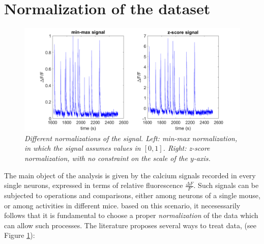 \documentclass[12pt, a4paper]{report}
\begin{document}
\section{Normalization of the dataset}


\begin{figure}[H]
	
	\begin{center}
		\hspace*{-1cm}
		\includegraphics[scale=.47]{normalizations.png} 
	\end{center} 
	\caption{\textit{Different normalizations of the signal. Left: min-max normalization, in which the signal assumes values in $[0,1]$. Right: z-score normalization, with no constraint on the scale of the $y$-axis. }}
	\label{normalizations}
\end{figure}

The main object of the analysis is given by the calcium signals recorded in every single neurons, expressed in terms of relative fluorescence $\frac{\Delta F}{F}$. Such signals can be subjected to operations and comparisons, either among neurons of a single mouse, or among activities in different mice. based on this scenario, it necesessarily follows that it is fundamental to choose a proper \textit{normalization} of the data which can allow such processes. The literature proposes several ways to treat data, (see Figure \ref{normalizations}):
\end{document}
